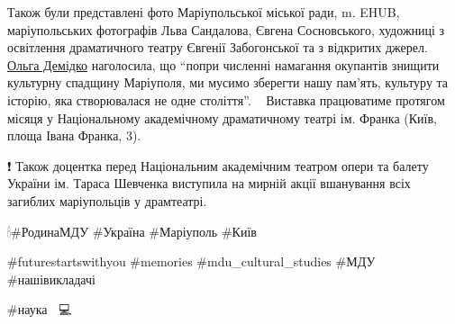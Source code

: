 Також були представлені фото Маріупольської міської ради, m. EHUB,
маріупольських фотографів Льва Сандалова, Євгена Сосновського, художниці з
освітлення драматичного театру Євгенії Забогонської та з відкритих джерел.
\href{\urlDemidkoIA}{Ольга Демідко} наголосила, що \enquote{попри численні намагання окупантів знищити
культурну спадщину Маріуполя, ми мусимо зберегти нашу пам'ять, культуру та
історію, яка створювалася не одне століття}.🙏🇺🇦 Виставка працюватиме
протягом місяця у Національному академічному драматичному театрі ім. Франка
(Київ, площа Івана Франка, 3).

❗ Також доцентка перед Національним академічним театром опери та балету
України ім. Тараса Шевченка  виступила на мирній акції вшанування всіх загиблих
маріупольців у драмтеатрі. 

🕯\#РодинаМДУ  \#Україна \#Маріуполь \#Київ

\#futurestartswithyou \#memories \#mdu\_cultural\_studies \#МДУ  \#нашівикладачі

\#наука  📝👨💻😊
